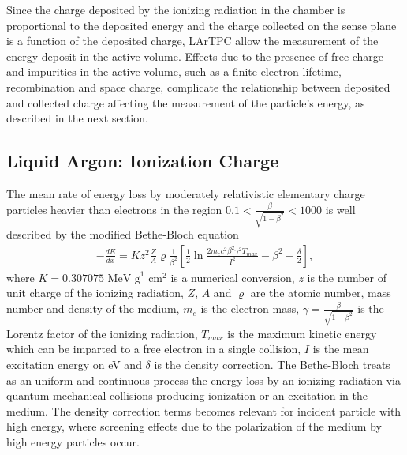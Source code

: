 Since the charge deposited by the ionizing radiation in the chamber is proportional to the deposited energy and the charge collected on the sense plane is a function of the deposited charge, LArTPC allow the measurement of the energy deposit in the active volume. Effects due to the presence of free charge and impurities in the active volume, such as a finite electron lifetime, recombination and space charge, complicate the relationship between deposited and collected charge affecting the measurement of the particle's energy, as described in the next section.
 
\subsection{Liquid Argon: Ionization Charge}\label{sec:charge}
The mean rate of energy loss by moderately relativistic elementary charge particles heavier than electrons in the region $0.1 < \frac{\beta}{\sqrt{1-\beta^2}} < 1000$ is well described by the modified Bethe-Bloch \cite{BB} equation
\begin{eqnarray*}
			- \frac{dE}{dx} = K z^2 \frac{Z}{A} \varrho \frac{1}{\beta^2} \left[ \frac{1}{2} \ln{\frac{2 m_e c^2 \beta^2 \gamma^2 T_{max}}{I^2}} - \beta^2 - \frac{\delta}{2}\right] ,
			\label{eq:BB}
\end{eqnarray*}
where $K = 0.307 075 \text{ MeV g}^1\text{ cm}^2$ is a numerical conversion, $z$ is the number of unit charge of the ionizing radiation, $Z$, $A$  and $\varrho$ are the atomic number, mass number and density of the medium,  $m_e$  is the electron mass, $\gamma = \frac{\beta}{\sqrt{1-\beta^2}} $ is the Lorentz factor of the ionizing radiation,  $T_{max}$ is the maximum kinetic energy which can be
imparted to a free electron in a single collision, $I$ is the mean excitation energy on eV and  $\delta$ is the  density correction. The Bethe-Bloch treats as an uniform and continuous process the energy loss by an ionizing radiation via quantum-mechanical collisions producing ionization or an excitation in the medium. The density correction  terms becomes relevant for incident particle with high energy, where screening effects due to the polarization of the medium by high energy particles occur.


